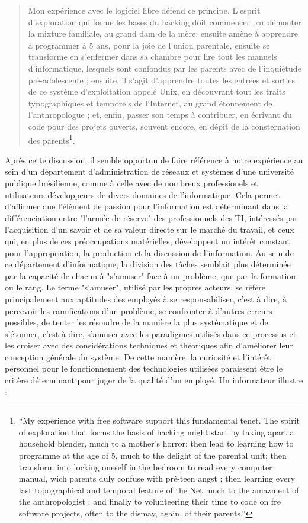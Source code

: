 \begin{quote}
Mon expérience avec le logiciel libre défend ce principe. L'esprit d'exploration qui forme les bases du hacking doit commencer par démonter la mixture familiale, au grand dam de la mère: ensuite amène à apprendre à programmer à 5 ans, pour la joie de l'union parentale, ensuite se transforme en s'enfermer dans sa chambre pour lire tout les manuels d'informatique, lesquels sont confondus par les parents avec de l'inquiétude pré-adolescente ; ensuite, il s'agit d'apprendre toutes les entrées et sorties de ce système d'exploitation appelé Unix, en découvrant tout les traits typographiques et temporels de l'Internet, au grand étonnement de l'anthropologue ; et, enfin, passer son temps à contribuer, en écrivant du code pour des projets ouverts, souvent encore, en dépit de la consternation des parents\footnote{“My experience with free software support this fundamental tenet. The spirit of exploration that forms the basis of hacking might start by taking apart a household blender, much to a mother’s horror: then lead to learning how to programme at the age of 5, much to the delight of the parental unit; then transform into locking oneself in the bedroom to read every computer manual, wich parents duly confuse with pré-teen angst ; then learning every last topographical and temporal feature of the Net much to the amazment of the anthropologist ; and finally to volunteering their time to code on fre software projects, often to the dismay, again, of their parents.”}\citep[p.298]{Coleman2003}.
\end{quote}

Après cette discussion, il semble opportun de faire référence à notre expérience au sein d'un département d'administration de réseaux et systèmes d'une université publique brésilienne, comme à celle avec de nombreux professionels et utilisateurs-développeurs de divers domaines de l'informatique. Cela permet d'affirmer que l'élément de passion pour l'information est déterminant dans la différenciation entre "l'armée de réserve" des professionnels des TI, intéressés par l'acquisition d'un savoir et de sa valeur directe sur le marché du travail, et ceux qui, en plus de ces préoccupations matérielles, développent un intérêt constant pour l'appropriation, la production et la discussion de l'information. Au sein de ce département d'informatique, la division des tâches semblait plus déterminée par la capacité de chacun à "s'amuser" face à un problème, que par la formation ou le rang. Le terme "s'amuser", utilisé par les propres acteurs, se réfère principalement aux aptitudes des employés à se responsabiliser, c'est à dire, à percevoir les ramifications d'un problème, se confronter à d'autres erreurs possibles, de tenter les résoudre de la manière la plus systématique et de s'étonner, c'est à dire, s'amuser avec les paradigmes utilisés dans ce processus et les croiser avec des considérations techniques et théoriques afin d'améliorer leur conception générale du système. De cette manière, la curiosité et l'intérêt personnel pour le fonctionnement des technologies utilisées paraissent être le critère déterminant pour juger de la qualité d'un employé. Un informateur illustre :

